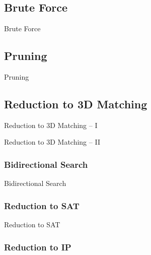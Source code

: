 \documentclass[t,10pt,
mathserif,xcolor=dvipsnames]{beamer}
\begin{document}
\subsection{Brute Force}

\begin{myframe}{Brute Force}

\end{myframe}

\subsection{Pruning}

\begin{myframe}{Pruning}

\end{myframe}

\subsection{Reduction to 3D Matching}

\begin{myframe}{Reduction to 3D Matching -- I}

\end{myframe}

\begin{myframe}{Reduction to 3D Matching -- II}

\end{myframe}

\subsubsection{Bidirectional Search}

\begin{myframe}{Bidirectional Search}

\end{myframe}

\subsubsection{Reduction to SAT}

\begin{myframe}{Reduction to SAT}

\end{myframe}

\subsubsection{Reduction to IP}
\end{document}
